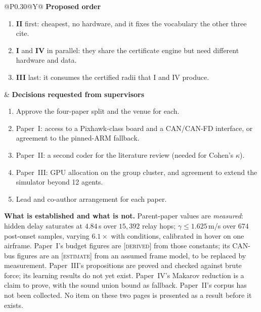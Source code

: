 \documentclass[10pt,a4paper]{article}
\newcommand{\hd}[1]{\textcolor{netcol}{\textbf{#1}}\enspace}
\newcommand{\prov}[1]{\textsc{\footnotesize[#1]}}
\begin{document}
\vspace{6pt}
\begin{tabularx}{\linewidth}{@{}P{0.30\linewidth}@{\hspace{0.03\linewidth}}Y@{}}
\hd{Proposed order}
\begin{enumerate}[leftmargin=1.3em]
\item \textbf{II} first: cheapest, no hardware, and it fixes the vocabulary the
  other three cite.
\item \textbf{I} and \textbf{IV} in parallel: they share the certificate engine
  but need different hardware and data.
\item \textbf{III} last: it consumes the certified radii that I and IV produce.
\end{enumerate}
&
\hd{Decisions requested from supervisors}
\begin{enumerate}[leftmargin=1.3em]
\item Approve the four-paper split and the venue for each.
\item Paper~I: access to a Pixhawk-class board and a CAN/CAN-FD interface,
  or agreement to the pinned-ARM fallback.
\item Paper~II: a second coder for the literature review (needed for
  Cohen's $\kappa$).
\item Paper~III: GPU allocation on the group cluster, and agreement to extend
  the simulator beyond 12 agents.
\item Lead and co-author arrangement for each paper.
\end{enumerate}
\end{tabularx}

\vspace{6pt}
\begin{tcolorbox}[enhanced, colback=soft, colframe=soft, arc=0pt, left=6pt,
                  right=6pt, top=3pt, bottom=3pt]
\footnotesize
\textbf{\color{accent}What is established and what is not.}
Parent-paper values are \emph{measured}: hidden delay saturates at
$4.84$\,s over $15{,}392$ relay hops; $\gamma\le1.625$\,m/s over $674$
post-onset samples, varying $6.1\times$ with conditions, calibrated in hover on
one airframe. Paper~I's budget figures are \prov{derived} from those constants;
its CAN-bus figures are an \prov{estimate} from an assumed frame model, to be
replaced by measurement. Paper~III's propositions are proved and checked
against brute force; its learning results do not yet exist. Paper~IV's Makarov
reduction is a claim to prove, with the sound union bound as fallback.
Paper~II's corpus has not been collected. No item on these two pages is
presented as a result before it exists.
\end{tcolorbox}
\end{document}
